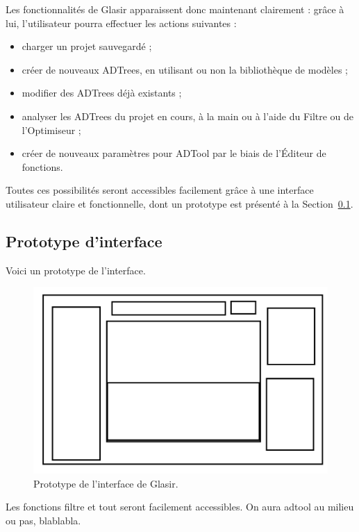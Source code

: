     Les fonctionnalités de Glasir apparaissent donc maintenant clairement : grâce à lui, l'utilisateur pourra effectuer les actions suivantes : 

    \begin{itemize}
    \item charger un projet sauvegardé ;
    \item créer de nouveaux ADTrees, en utilisant ou non la bibliothèque de modèles ;
    \item modifier des ADTrees déjà existants ;
    \item analyser les ADTrees du projet en cours, à la main ou à l'aide du Filtre ou de l'Optimiseur ;
    \item créer de nouveaux paramètres pour ADTool par le biais de l'Éditeur de fonctions.
    \end{itemize}  

    Toutes ces possibilités seront accessibles facilement grâce à une interface utilisateur claire et fonctionnelle, dont un prototype est présenté à la {\sc Section}~\ref{sec:interface}.      
    
    \subsection{Prototype d'interface}
    \label{sec:interface}
    
    Voici un prototype de l'interface.
    \begin{figure}[h!]
        \centering
        \includegraphics[height=0.4\textwidth]{figure/interface.png}
        \caption{Prototype de l'interface de Glasir.}
        \label{fig:interface}
    \end{figure}
    
    Les fonctions filtre et tout seront facilement accessibles. On aura adtool au milieu ou pas, blablabla.
